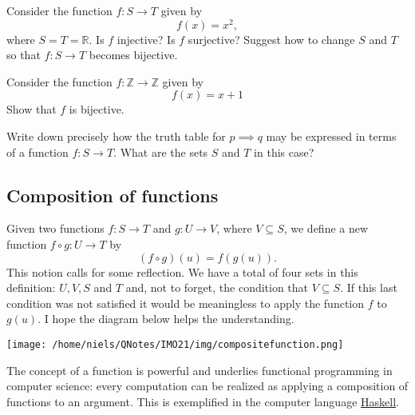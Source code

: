 \begin{exercise}
  Consider the function $f:S \rightarrow T$ given by
  $$
    f(x) = x^2,
  $$
  where $S = T = \mathbb{R}$.
  Is $f$ injective? Is $f$ surjective? Suggest how to change $S$ and $T$ so that $f:S\rightarrow T$ becomes
  bijective.
\end{exercise}

\begin{exercise}
  Consider the function $f:\mathbb{Z} \rightarrow \mathbb{Z}$ given by
  $$
    f(x) = x + 1
  $$
  Show that $f$ is bijective.
\end{exercise}

\begin{exercise}
  Write down precisely how the truth table for $p\implies q$ may
  be expressed in terms of a function $f: S\rightarrow T$. What are the sets $S$ and $T$ in this case?
\end{exercise}

\subsection{Composition of functions}

Given two functions $f: S\rightarrow T$ and $g: U\rightarrow V$, where
$V\subseteq S$, we define a new function $f\circ g: U \rightarrow T$ by
$$
  (f\circ g)(u) = f(g(u)).
$$
This notion calls for some reflection. We have a total of four sets
in this definition: $U, V, S$ and $T$ and, not to forget, the condition that
$V\subseteq S$. If this last condition was not satisfied it would be
meaningless to apply the function $f$ to $g(u)$.
I hope the diagram below helps the
understanding.

\begin{center}\texttt{[image: /home/niels/QNotes/IMO21/img/compositefunction.png]}\end{center}

\begin{remark}
  The concept of a function is powerful and underlies functional programming in computer science: every computation can be realized as applying a composition of functions to an argument. This is exemplified in the computer language
  \href{https://www.haskell.org/}{Haskell}.
\end{remark}

